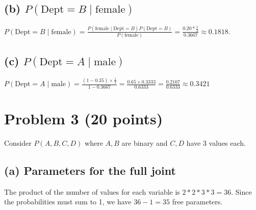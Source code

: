 \documentclass[11pt]{article}
\begin{document}
\subsection*{(b) $P(\text{Dept}=B \mid \text{female})$}
$P(\text{Dept}=B \mid \text{female})= \frac{P(\text{female} \mid \text{Dept}=B)P(\text{Dept}=B)}{P(\text{female})} = \frac{0.20 * \frac{1}{3}}{0.3667} \approx 0.1818$.

\subsection*{(c) $P(\text{Dept}=A \mid \text{male})$}
$P(\text{Dept}=A \mid \text{male}) = \frac{(1-0.35)\times\frac{1}{3}}{1-0.3667} = \frac{0.65 \times 0.3333}{0.6333} = \frac{0.2167}{0.6333} \approx 0.3421$

\section*{Problem 3 (20 points)}

Consider $P(A,B,C,D)$ where $A,B$ are binary and $C,D$ have 3 values each.

\subsection*{(a) Parameters for the full joint}
The product of the number of values for each variable is $2 * 2 * 3 * 3 = 36$. Since the probabilities must sum to 1, we have $36 - 1 = 35$ free parameters.
\end{document}
